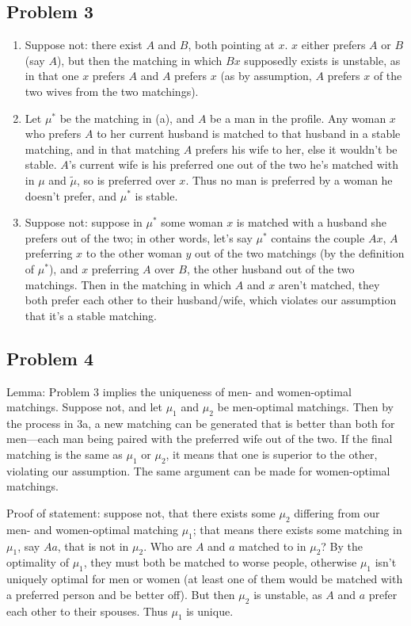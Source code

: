 \documentclass[11pt]{article}
\newcommand{\ms}{\mu^*}
\begin{document}
\subsection*{Problem 3}

\begin{enumerate}[label=(\alph*)]
\item Suppose not: there exist $A$ and $B$, both pointing at $x$. $x$ either
  prefers $A$ or $B$ (say $A$), but then the matching in which $Bx$
  supposedly exists is unstable, as in that one $x$ prefers $A$ and $A$ prefers
  $x$ (as by assumption, $A$ prefers $x$ of the two wives from the two matchings).
\item Let $\mu^*$ be the matching in (a), and $A$ be a man in the profile.
  Any woman $x$ who prefers $A$ to her current husband is matched to that
  husband in a stable matching, and in that matching $A$ prefers his wife to her,
  else it wouldn't be stable. $A$'s current wife is his preferred one out of
  the two he's matched with in $\mu$ and $\tilde{\mu}$, so is preferred over
  $x$. Thus no man is preferred by a woman he doesn't prefer, and $\ms$ is
  stable.
\item Suppose not: suppose in $\ms$ some woman $x$ is matched with a husband
  she prefers out of the two; in other words, let's say $\ms$ contains the
  couple $Ax$, $A$ preferring $x$ to the other woman $y$ out of the two
  matchings (by the definition of $\ms$),
  and $x$ preferring $A$ over $B$, the other husband out of the two
  matchings. Then in the matching in which
  $A$ and $x$ aren't matched, they both prefer each other to their husband/wife,
  which violates our assumption that it's a stable matching.
\end{enumerate}

\subsection*{Problem 4}

Lemma: Problem 3 implies the uniqueness of men- and women-optimal matchings.
Suppose not, and let $\mu_1$ and $\mu_2$ be men-optimal matchings. Then by the
process in 3a, a new matching can be generated that is better than both for
men---each man being paired with the preferred wife out of the two. If the final
matching is the same as $\mu_1$ or $\mu_2$, it means that one is superior to the
other, violating our assumption. The same argument can be made for women-optimal
matchings.

Proof of statement: suppose not, that there exists some $\mu_2$ differing from
our men- and women-optimal matching $\mu_1$; that means there exists some
matching in $\mu_1$, say $Aa$, that is not in $\mu_2$. Who are $A$ and $a$
matched to in $\mu_2$? By the optimality of $\mu_1$, they must both be matched
to worse people, otherwise $\mu_1$ isn't uniquely optimal for men or women (at
least one of them would be matched with a preferred person and be better off).
But then $\mu_2$ is unstable, as $A$ and $a$ prefer each other to their
spouses. Thus $\mu_1$ is unique. 
\end{document}
